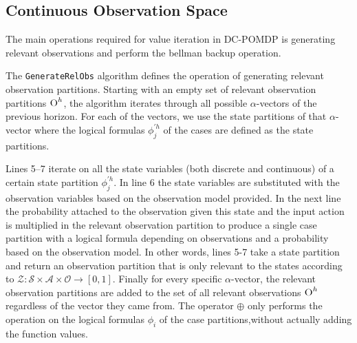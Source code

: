 \documentclass{article}
\begin{document}
\subsection{Continuous Observation Space} 
The main operations required for value iteration in DC-POMDP is generating relevant observations and perform the bellman backup operation. 

The \texttt{GenerateRelObs} algorithm defines the operation of generating relevant observation partitions. Starting with an empty set of relevant observation partitions $\textsc{O}^{h}$, the algorithm iterates through all possible $\alpha$-vectors of the previous horizon. For each of the vectors, we use the state partitions of that $\alpha$-vector where the logical formulas $\phi_j^{'h}$ of the cases are defined as the state partitions. 

Lines 5--7 iterate on all the state variables (both discrete and continuous) of a certain state partition $\phi_j^{'h}$. In line 6 the state variables are substituted with the observation variables based on the observation model provided. In the next line the probability attached to the observation given this state and the input action is multiplied in the relevant observation partition to produce a single case partition with a logical formula depending on observations and a probability based on the observation model.
In other words, lines 5-7 take a state partition and return an observation partition that is only relevant to the states according to $\mathcal{Z} : \mathcal{S} \times \mathcal{A} \times \mathcal{O} \rightarrow [ 0, 1 ]$. 
Finally for every specific $\alpha$-vector, the relevant observation partitions are added to the set of all relevant observations $\textsc{O}^{h}$ regardless of the vector they came from. The operator $\oplus$ only performs the operation on the logical formulas $\phi_i$ of the case partitions,without actually adding the function values. 
\end{document}
